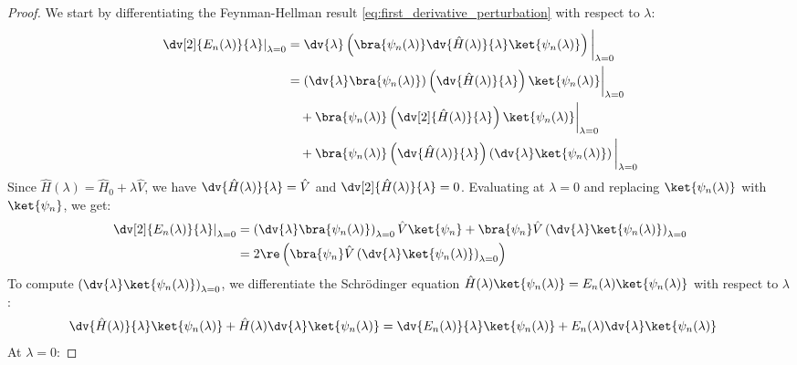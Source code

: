 \begin{proof}
    We start by differentiating the Feynman-Hellman result
    \eqref{eq:first_derivative_perturbation} with respect to $\lambda$:
    \begin{align} \label{eq:second_deriv_start}
        \left.\dv[2]{E_n(\lambda)}{\lambda}\right|_{\lambda=0} &=
        \dv{\lambda}\left(\bra{\psi_n(\lambda)} \dv{\hat
        H(\lambda)}{\lambda} \ket{\psi_n(\lambda)}\right)\bigg|_{\lambda=0} \\
        &= \left(\dv{\lambda}\bra{\psi_n(\lambda)}\right)
        \left(\dv{\hat H(\lambda)}{\lambda}\right)
        \ket{\psi_n(\lambda)} \bigg|_{\lambda=0} \notag \\
        &\quad + \bra{\psi_n(\lambda)} \left(\dv[2]{\hat
        H(\lambda)}{\lambda}\right) \ket{\psi_n(\lambda)}
        \bigg|_{\lambda=0} \notag \\
        &\quad + \bra{\psi_n(\lambda)} \left(\dv{\hat
        H(\lambda)}{\lambda}\right)
        \left(\dv{\lambda}\ket{\psi_n(\lambda)}\right) \bigg|_{\lambda=0} \notag
    \end{align}
    Since $\hat H(\lambda) = \hat H_0 + \lambda \hat V$, we have
    $\dv{\hat H(\lambda)}{\lambda} = \hat V$ and $\dv[2]{\hat
    H(\lambda)}{\lambda} = 0$. Evaluating at $\lambda=0$ and
    replacing $\ket{\psi_n(\lambda)}$ with $\ket{\psi_n}$, we get:
    \begin{align} \label{eq:second_deriv_intermediate}
        \left.\dv[2]{E_n(\lambda)}{\lambda}\right|_{\lambda=0} &=
        \left(\dv{\lambda}\bra{\psi_n(\lambda)}\right)_{\lambda=0}
        \hat V \ket{\psi_n} + \bra{\psi_n} \hat V
        \left(\dv{\lambda}\ket{\psi_n(\lambda)}\right)_{\lambda=0} \\
        &= 2 \re \left( \bra{\psi_n} \hat V
            \left(\dv{\lambda}\ket{\psi_n(\lambda)}\right)_{\lambda=0}
        \right) \notag
    \end{align}
    To compute
    $\left(\dv{\lambda}\ket{\psi_n(\lambda)}\right)_{\lambda=0}$, we
    differentiate the Schrödinger equation $\hat
    H(\lambda)\ket{\psi_n(\lambda)} =
    E_n(\lambda)\ket{\psi_n(\lambda)}$ with respect to $\lambda$:
    \begin{align} \label{eq:schrodinger_deriv}
        \dv{\hat H(\lambda)}{\lambda} \ket{\psi_n(\lambda)} + \hat
        H(\lambda) \dv{\lambda}\ket{\psi_n(\lambda)} &=
        \dv{E_n(\lambda)}{\lambda} \ket{\psi_n(\lambda)} +
        E_n(\lambda) \dv{\lambda}\ket{\psi_n(\lambda)}
    \end{align}
    At $\lambda=0$:

\end{proof}
